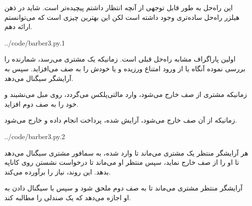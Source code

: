 \documentclass{book}
\begin{document}
    این راه‌حل به طور قابل توجهی از آنچه انتظار داشتم پیچیده‌تر است. شاید در ذهن هیلزر راه‌حل ساده‌تری وجود داشته است لکن 
    این بهترین چیزی است که می‌توانستم ارائه دهم. 

\begin{latin}
%

{../code/barber3.py.1}
\end{latin}

    اولین پاراگراف مشابه راه‌حل قبلی است. زمانیکه یک مشتری می‌رسد، شمارنده را بررسی نموده آنگاه یا از ورود امتناع ورزیده و یا خودش را به 
    صف می‌افزاید. سپس به آرایشگر سیگنال می‌دهد. 

    زمانیکه مشتری از صف خارج می‌شود، وارد مالتی‌پلکس می‌گردد، روی مبل می‌نشیند و خود را به صف دوم افزاید. 

    زمانیکه از آن صف خارج می‌شود، آرایش شده، پرداخت انجام داده و خارج می‌شود.

\begin{latin}
%

{../code/barber3.py.2}
\end{latin}


    هر آرایشگر منتظر یک مشتری می‌ماند تا وارد شده، به سمافور مشتری سیگنال می‌دهد تا او را از صف خارج نماید، سپس منتظر او می‌ماند 
    تا درخواست نشستن روی کاناپه بدهد. این روند، نیاز  را برآورده می‌کند.

    آرایشگر منتظر مشتری می‌ماند تا به صف دوم ملحق شود و سپس با سیگنال دادن به او اجازه می‌دهد که یک صندلی را مطالبه کند. 
\end{document}
